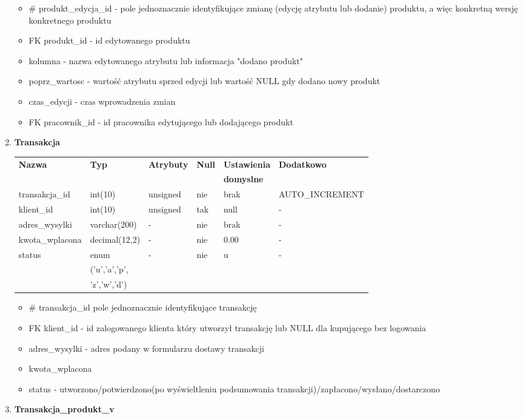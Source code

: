 \begin{enumerate}
\begin{tabular}{|l|l|l|l|l|l|}
\end{tabular}
\begin{itemize}
	\item \# produkt\_edycja\_id - pole jednoznacznie identyfikujące zmianę (edycję atrybutu lub dodanie) produktu, a więc konkretną wersję konkretnego produktu
	\item FK produkt\_id - id edytowanego produktu
	\item kolumna - nazwa edytowanego atrybutu lub informacja "dodano produkt"
	\item poprz\_wartosc - wartość atrybutu sprzed edycji lub  wartość NULL gdy dodano nowy produkt
	\item czas\_edycji - czas wprowadzenia zmian
	\item FK pracownik\_id - id pracownika edytującego lub dodającego produkt
\end{itemize}

\item \textbf{Transakcja}

\begin{tabular}{|l|l|l|l|l|l|} \hline
	\textbf{Nazwa} & \textbf{Typ} & \textbf{Atrybuty} & \textbf{Null} & \textbf{Ustawienia} & \textbf{Dodatkowo} \\
	&&&&\textbf{domyslne}&\\
	\hline
	transakcja\_id&int(10)&unsigned&nie&brak&AUTO\_INCREMENT \\
	klient\_id&int(10)&unsigned&tak&null&-\\
	adres\_wysylki&varchar(200)&-&nie&brak&-\\
	kwota\_wplacona&decimal(12,2)&-&nie&0.00&-\\
	status&enum&-&nie&u&-\\
	&('u','a','p',&&&&\\
	&'z','w','d')&&&&\\
	\hline
	
\end{tabular}

\begin{itemize}
	\item \# transakcja\_id pole jednoznacznie identyfikujące transakcję
	\item FK klient\_id - id zalogowanego klienta który utworzył transakcję lub NULL dla kupującego bez logowania
	\item adres\_wysylki - adres podany w formularzu dostawy transakcji
	\item kwota\_wplacona
	\item status - utworzono/potwierdzono(po wyświeltleniu podsumowania transakcji)/zapłacono/wysłano/dostarczono
\end{itemize}
\item \textbf{Transakcja\_produkt\_v}


\end{enumerate}
